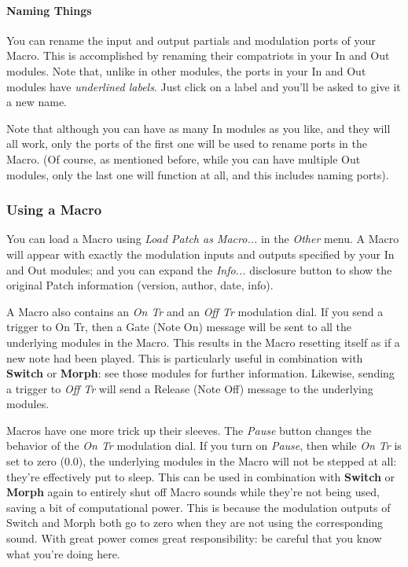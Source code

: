 \documentclass{article}
\begin{document}
\paragraph{Naming Things}

You can rename the input and output partials and modulation ports of your Macro.  This is accomplished by renaming their compatriots in your In and Out modules.  Note that, unlike in other modules, the ports in your In and Out modules have {\it underlined labels}.  Just click on a label and you'll be asked to give it a new name.

Note that although you can have as many In modules as you like, and they will all work, only the ports of the first one will be used to rename ports in the Macro.  (Of course, as mentioned before, while you can have multiple Out modules, only the last one will function at all, and this includes naming ports).

\subsubsection{Using a Macro}

You can load a Macro using {\it Load Patch as Macro...} in the {\it Other} menu.  A Macro will appear with exactly the modulation inputs and outputs specified by your In and Out modules; and you can expand the {\it Info...} disclosure button to show the original Patch information (version, author, date, info).

A Macro also contains an {\it On Tr} and an {\it Off Tr} modulation dial.  If you send a trigger to On Tr, then a Gate (Note On) message will be sent to all the underlying modules in the Macro.  This results in the Macro resetting itself as if a new note had been played.  This is particularly useful in combination with {\bf Switch} or {\bf Morph}: see those modules for further information.  Likewise, sending a trigger to {\it Off Tr} will send a Release (Note Off) message to the underlying modules.

Macros have one more trick up their sleeves.  The {\it Pause} button changes the behavior of the {\it On Tr} modulation dial.  If you turn on {\it Pause}, then while {\it On Tr} is set to zero (0.0), the underlying modules in the Macro will not be stepped at all: they're effectively put to sleep.  This can be used in combination with {\bf Switch} or {\bf Morph} again to entirely shut off Macro sounds while they're not being used, saving a bit of computational power.  This is because the modulation outputs of Switch and Morph both go to zero when they are not using the corresponding sound.  With great power comes great responsibility: be careful that you know what you're doing here.
\end{document}
